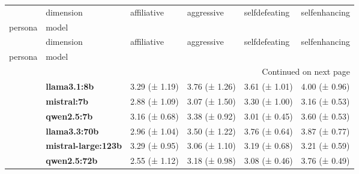 \begin{longtable}{llllll}
\toprule
 & dimension & affiliative & aggressive & selfdefeating & selfenhancing \\
persona & model &  &  &  &  \\
\midrule
\endfirsthead
\toprule
 & dimension & affiliative & aggressive & selfdefeating & selfenhancing \\
persona & model &  &  &  &  \\
\midrule
\endhead
\midrule
\multicolumn{6}{r}{Continued on next page} \\
\midrule
\endfoot
\bottomrule
\endlastfoot
\multirow[t]{6}{*}{\textbf{base}} & \textbf{llama3.1:8b} & 3.29 (± 1.19) & 3.76 (± 1.26) & 3.61 (± 1.01) & 4.00 (± 0.96) \\
\textbf{} & \textbf{mistral:7b} & 2.88 (± 1.09) & 3.07 (± 1.50) & 3.30 (± 1.00) & 3.16 (± 0.53) \\
\textbf{} & \textbf{qwen2.5:7b} & 3.16 (± 0.68) & 3.38 (± 0.92) & 3.01 (± 0.45) & 3.60 (± 0.53) \\
\textbf{} & \textbf{llama3.3:70b} & 2.96 (± 1.04) & 3.50 (± 1.22) & 3.76 (± 0.64) & 3.87 (± 0.77) \\
\textbf{} & \textbf{mistral-large:123b} & 3.29 (± 0.95) & 3.06 (± 1.10) & 3.19 (± 0.68) & 3.21 (± 0.59) \\
\textbf{} & \textbf{qwen2.5:72b} & 2.55 (± 1.12) & 3.18 (± 0.98) & 3.08 (± 0.46) & 3.76 (± 0.49) \\
\cline{1-6}
\end{longtable}
